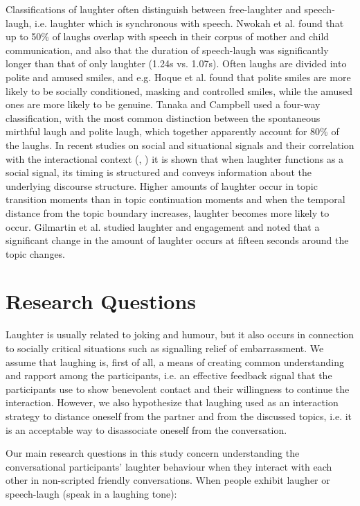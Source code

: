 \documentclass[10pt,journal,compsoc]{IEEEtran}
\begin{document}
Classifications of laughter often distinguish between free-laughter and speech-laugh, i.e. laughter which is synchronous with speech. Nwokah et al. \cite{Nwokah:ea:99} found that up to 50\% of laughs overlap with speech in their corpus of mother and child communication, and also that the duration of speech-laugh was significantly longer than that of only laughter (1.24s vs. 1.07s). Often laughs are divided into polite and amused smiles, and e.g. Hoque et al. \cite{Hoque:ea:11} found that polite smiles are more likely to be socially conditioned, masking and controlled smiles, while the amused ones are more likely to be genuine. Tanaka and Campbell \cite{Tanaka:Campbell:11} used a four-way classification, with the most common distinction between the spontaneous mirthful laugh and polite laugh, which together apparently account for 80\% of the laughs. In recent studies on social and situational signals and their correlation with the interactional context (\cite{Bonin:ea:14}, \cite{Bonin:16}) it is shown that when laughter functions as a social signal, its timing is structured and conveys information about the underlying discourse structure. Higher amounts of laughter occur in topic transition moments than in topic continuation moments and when the temporal distance from the topic boundary increases, laughter becomes more likely to occur. Gilmartin et al. \cite{Gilmartin:ea:13} studied laughter and engagement and noted that a significant change in the amount of laughter occurs at fifteen seconds around the topic changes.

\section{Research Questions}
\label{sec:research-questions}

Laughter is usually related to joking and humour, but it also occurs in connection to socially critical situations such as signalling relief of embarrassment. We assume that laughing is, first of all, a means of creating common understanding and rapport among the participants, i.e. an effective feedback signal that the participants use to show benevolent contact and their willingness to continue the interaction. However, we also hypothesize that laughing used as an interaction strategy to distance oneself from the partner and from the discussed topics, i.e. it is an acceptable way to disassociate oneself from the conversation.

Our main research questions in this study concern understanding the conversational participants' laughter behaviour when they interact with each other in non-scripted friendly conversations. When people exhibit laugher or speech-laugh (speak in a laughing tone):
\end{document}
